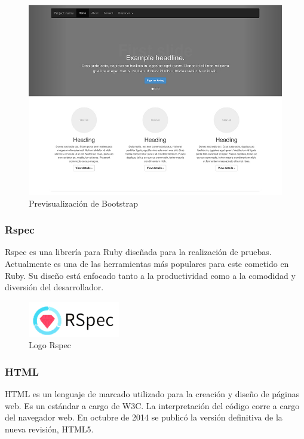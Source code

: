 		\begin{figure}[H]
		\centering
		\includegraphics[width=120mm, fbox={\fboxrule} 4mm]{images/04-metodo/24-bootstrap_preview.jpg}
		\caption{Previsualización de Bootstrap}
		\label{fig:bootstrap-preview}
		\end{figure}
		
		\subsubsection{Rspec}
		Rspec es una librería para Ruby diseñada para la realización de pruebas. Actualmente es una de las herramientas más populares para este cometido en Ruby. Su diseño está enfocado tanto a la productividad como a la comodidad y diversión del desarrollador.

		\begin{figure}[H]
		\centering
		\includegraphics[width=40mm, fbox={\fboxrule} 4mm]{images/04-metodo/25-rspec_logo.png}
		\caption{Logo Rspec}
		\label{fig:rspec-logo}
		\end{figure}
		
		\subsubsection{\ac{HTML}}
		\ac{HTML} es un lenguaje de marcado utilizado para la creación y diseño de páginas web. Es un estándar a cargo de \ac{W3C}. La interpretación del código corre a cargo del navegador web. En octubre de 2014 se publicó la versión definitiva de la nueva revisión, \ac{HTML}5.
		
